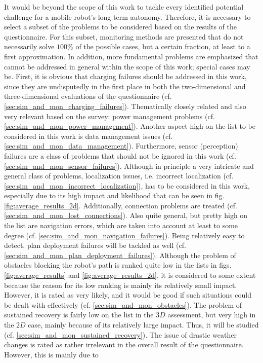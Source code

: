 \documentclass[english, master, utf8]{base/thesis_KBS}
\begin{document}
\noindent
It would be beyond the scope of this work to tackle every identified potential challenge for a mobile robot's long-term autonomy. Therefore, it is necessary to select a subset of the
problems to be considered based on the results of the questionnaire. For this subset, monitoring methods are presented that do not necessarily solve $100\%$ of the possible cases,
but a certain fraction, at least to a first approximation. In addition, more fundamental problems are emphasized that cannot be addressed in general within the scope of this work;
special cases may be. 
First, it is obvious that charging failures should be addressed in this work, since they are undisputedly in the first place in both the two-dimensional and three-dimensional
evaluations of the questionnaire (cf. \ref{sec:sim_and_mon_charging_failures}). Thematically closely related and also very relevant based on the survey:
power management problems (cf. \ref{sec:sim_and_mon_power_management}). Another aspect high on the list to be considered in this work is data management
issues (cf. \ref{sec:sim_and_mon_data_management}). Furthermore, sensor (perception) failures are a class of problems that should not be ignored in this work
(cf. \ref{sec:sim_and_mon_sensor_failures}). Although in principle a very intricate and general class of problems, localization issues, i.e. incorrect
localization (cf. \ref{sec:sim_and_mon_incorrect_localization}), has to be considered in this work, especially due to its high impact and likelihood
that can be seen in fig. \ref{fig:average_results_2d}. Additionally, connection problems are treated (cf. \ref{sec:sim_and_mon_lost_connections}). Also quite
general, but pretty high on the list are navigation errors, which are taken into account at least to some degree (cf. \ref{sec:sim_and_mon_navigation_failures}). Being relatively easy to detect, plan deployment failures will be tackled as well (cf. \ref{sec:sim_and_mon_plan_deployment_failures}). Although the problem of obstacles blocking the robot's path is ranked quite low in the lists in figs. \ref{fig:average_results} and
\ref{fig:average_results_2d}, it is considered to some extent because the reason for its low ranking is mainly its relatively small impact. However, it is rated as very likely,
and it would be good if such situations could be dealt with effectively (cf. \ref{sec:sim_and_mon_obstacles}). The problem of sustained recovery is fairly low on
the list in the $3D$ assessment, but very high in the $2D$ case, mainly because of its relatively large impact. Thus, it will be studied (cf. \ref{sec:sim_and_mon_sustained_recovery}). The issue of drastic weather changes is rated as rather irrelevant in the overall result of the questionnaire. However, this is mainly due to
\end{document}
